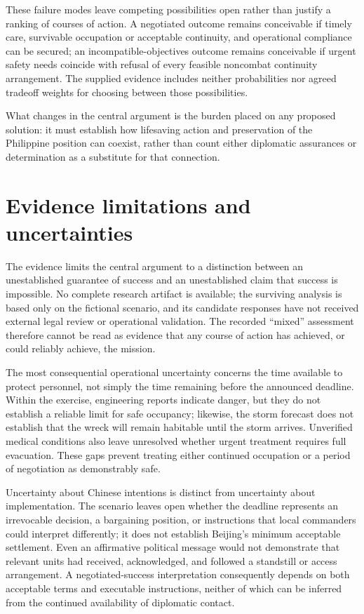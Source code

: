 \documentclass[11pt]{article}
\begin{document}
These failure modes leave competing possibilities open rather than justify a ranking of courses of action. A negotiated outcome remains conceivable if timely care, survivable occupation or acceptable continuity, and operational compliance can be secured; an incompatible-objectives outcome remains conceivable if urgent safety needs coincide with refusal of every feasible noncombat continuity arrangement. The supplied evidence includes neither probabilities nor agreed tradeoff weights for choosing between those possibilities.

What changes in the central argument is the burden placed on any proposed solution: it must establish how lifesaving action and preservation of the Philippine position can coexist, rather than count either diplomatic assurances or determination as a substitute for that connection.

\section{Evidence limitations and uncertainties}
The evidence limits the central argument to a distinction between an unestablished guarantee of success and an unestablished claim that success is impossible. No complete research artifact is available; the surviving analysis is based only on the fictional scenario, and its candidate responses have not received external legal review or operational validation. The recorded “mixed” assessment therefore cannot be read as evidence that any course of action has achieved, or could reliably achieve, the mission.

The most consequential operational uncertainty concerns the time available to protect personnel, not simply the time remaining before the announced deadline. Within the exercise, engineering reports indicate danger, but they do not establish a reliable limit for safe occupancy; likewise, the storm forecast does not establish that the wreck will remain habitable until the storm arrives. Unverified medical conditions also leave unresolved whether urgent treatment requires full evacuation. These gaps prevent treating either continued occupation or a period of negotiation as demonstrably safe.

Uncertainty about Chinese intentions is distinct from uncertainty about implementation. The scenario leaves open whether the deadline represents an irrevocable decision, a bargaining position, or instructions that local commanders could interpret differently; it does not establish Beijing’s minimum acceptable settlement. Even an affirmative political message would not demonstrate that relevant units had received, acknowledged, and followed a standstill or access arrangement. A negotiated-success interpretation consequently depends on both acceptable terms and executable instructions, neither of which can be inferred from the continued availability of diplomatic contact.
\end{document}
